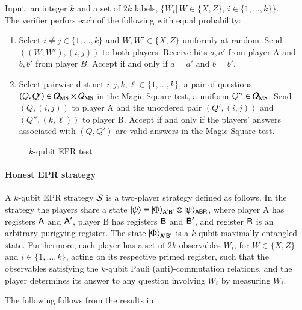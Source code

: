 \vspace{10pt}
\begin{center}
\begin{mdframed}
    Input: an integer $k$ and a set of $2k$ labels, $\{W_i|\, W\in\{X,Z\},\,i\in\{1,\ldots,k\}\}$.\\
		The verifier perfors each of the following with equal probability:
		\begin{enumerate}
		\item Select $i\neq j\in\{1,\ldots,k\}$ and $W,W'\in\{X,Z\}$ uniformly at random. Send $((W,W'),(i,j))$ to both players. Receive bits $a,a'$ from player A and $b,b'$ from player $B$. Accept if and only if $a=a'$ and $b=b'$.
		\item Select pairwise distinct $i,j,k,\ell\in\{1,\ldots,k\}$, a pair of questions $(Q,Q') \in \mathcal{Q}_{\textsc{MS}}\times\mathcal{Q}_{\textsc{MS}}$ in the Magic Square test, a uniform $Q''\in\mathcal{Q}_{\textsc{MS}}$. Send $(Q,(i,j))$ to player A and the unordered pair $(Q',(i,j))$ and $(Q'',(k,\ell))$ to player B. Accept if and only if the players' answers associated with $(Q,Q')$ are valid answers in the Magic Square test. 
   \end{enumerate}    
\end{mdframed}
\end{center}
\begin{figure}[H]
\caption{$k$-qubit EPR test~\cite{reichardt}}
\label{fig:epr_test}
\end{figure}

\paragraph{Honest EPR strategy} A $k$-qubit EPR strategy $\mathcal{S}$ is a two-player strategy defined as follows. In the strategy the players share a state $|\psi\rangle = |\Phi\rangle_{{\textsf{A}}'{\textsf{B}}'} \otimes |\psi\rangle_{{\textsf{ABR}}}$, where player A has registers ${\textsf{A}}$ and ${\textsf{A}}'$, player B has registers ${\textsf{B}}$ and ${\textsf{B}}'$, and register ${\textsf{R}}$ is an arbitrary purigying register. The state $|\Phi\rangle_{{\textsf{A}}'{\textsf{B}}'}$ is a $k$-qubit maximally entangled state. Furthermore, each player has a set of $2k$ observables $W_i$, for $W\in \{X,Z\}$ and $i\in\{1,\ldots,k\}$, acting on its respective primed register, such that the observables satisfying the $k$-qubit Pauli (anti)-commutation relations, and the player determines its answer to any question involving $W_i$ by measuring $W_i$. 

The following follows from the results in~\cite{reichardt}. 


